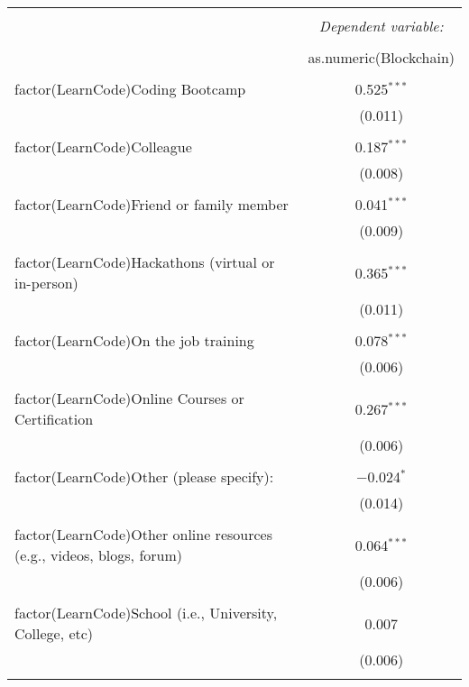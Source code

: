
\begin{table}[!htbp] \centering 
  \caption{} 
  \label{} 
\begin{tabular}{@{\extracolsep{5pt}}lc} 
\\[-1.8ex]\hline 
\hline \\[-1.8ex] 
 & \multicolumn{1}{c}{\textit{Dependent variable:}} \\ 
\cline{2-2} 
\\[-1.8ex] & as.numeric(Blockchain) \\ 
\hline \\[-1.8ex] 
 factor(LearnCode)Coding Bootcamp & 0.525$^{***}$ \\ 
  & (0.011) \\ 
  & \\ 
 factor(LearnCode)Colleague & 0.187$^{***}$ \\ 
  & (0.008) \\ 
  & \\ 
 factor(LearnCode)Friend or family member & 0.041$^{***}$ \\ 
  & (0.009) \\ 
  & \\ 
 factor(LearnCode)Hackathons (virtual or in-person) & 0.365$^{***}$ \\ 
  & (0.011) \\ 
  & \\ 
 factor(LearnCode)On the job training & 0.078$^{***}$ \\ 
  & (0.006) \\ 
  & \\ 
 factor(LearnCode)Online Courses or Certification & 0.267$^{***}$ \\ 
  & (0.006) \\ 
  & \\ 
 factor(LearnCode)Other (please specify): & $-$0.024$^{*}$ \\ 
  & (0.014) \\ 
  & \\ 
 factor(LearnCode)Other online resources (e.g., videos, blogs, forum) & 0.064$^{***}$ \\ 
  & (0.006) \\ 
  & \\ 
 factor(LearnCode)School (i.e., University, College, etc) & 0.007 \\ 
  & (0.006) \\ 
  & \\ 

\end{tabular}
\end{table}
